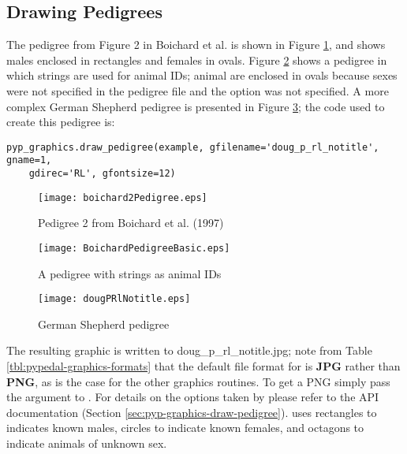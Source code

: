 \subsection{Drawing Pedigrees}
\label{sec:graphics-drawing-pedigrees}
The pedigree from Figure 2 in Boichard et al. \citeyear{ref352} is shown in Figure \ref{fig:boichard2-pedigree}, and shows males enclosed in rectangles and females in ovals.  Figure \ref{fig:new-ids2-pedigree-basic} shows a pedigree in which strings are used for animal IDs; animal are enclosed in ovals because sexes were not specified in the pedigree file and the  option was not specified.  A more complex German Shepherd pedigree is presented in Figure \ref{fig:doug-pedigree-basic}; the code used to create this pedigree is:
\begin{verbatim}
pyp_graphics.draw_pedigree(example, gfilename='doug_p_rl_notitle', gname=1,
    gdirec='RL', gfontsize=12)
\end{verbatim}
\begin{figure}
  \begin{center}
    \texttt{[image: boichard2Pedigree.eps]}
    \caption{Pedigree 2 from Boichard et al. (1997)}
    \label{fig:boichard2-pedigree}
  \end{center}
\end{figure}
\begin{figure}
  \begin{center}
    \texttt{[image: BoichardPedigreeBasic.eps]}
    \caption{A pedigree with strings as animal IDs}
    \label{fig:new-ids2-pedigree-basic}
  \end{center}
\end{figure}
\begin{figure}
  \begin{center}
    \texttt{[image: dougPRlNotitle.eps]}
    \caption{German Shepherd pedigree}
    \label{fig:doug-pedigree-basic}
  \end{center}
\end{figure}
The resulting graphic is written to doug\_p\_rl\_notitle.jpg; note from Table \ref{tbl:pypedal-graphics-formats} that the default file format for  is \textbf{JPG} rather than \textbf{PNG}, as is the case for the other graphics routines.  To get a PNG simply pass the argument  to .  For details on the options taken by  please refer to the API documentation (Section \ref{sec:pyp-graphics-draw-pedigree}).  uses rectangles to indicates known males, circles to indicate known females, and octagons to indicate animals of unknown sex.

